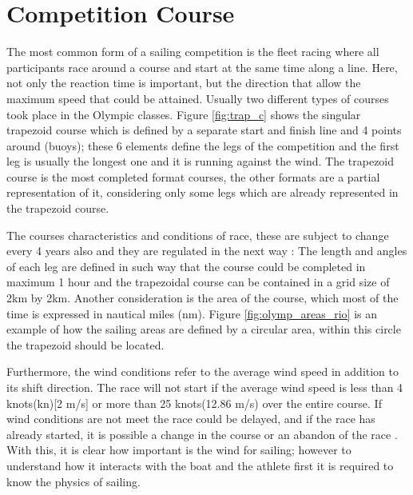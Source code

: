 \section{Competition Course}\label{tracks}
The most common form of a sailing competition is the fleet racing where all participants race around a course and start at the same time along a line. Here, not only the reaction time is important, but the direction that allow the maximum speed that could be attained. Usually two different types of courses took place in the Olympic classes. Figure \ref{fig:trap_c} shows the singular trapezoid course which is defined by a separate start and finish line and 4 points around (buoys); these 6 elements define the legs of the competition and the first leg is usually the longest one and it is running against the wind.
The trapezoid course is the most completed format courses, the other formats are a partial representation of it, considering only some legs which are already represented in the trapezoid course.\par 

The courses characteristics and conditions of race, these are subject to change every 4 years also and they are regulated in the next way \cite{race_pol}: The length and angles of each leg are defined in such way that the course could be completed in maximum 1 hour and the trapezoidal course can be contained in a grid size of 2km by 2km.  Another consideration is the area of the course,  which most of the time is expressed in nautical miles (nm). Figure \ref{fig:olymp_areas_rio} is an example of how the sailing areas are defined by a circular area, within this circle the trapezoid should be located. \par 
Furthermore, the wind conditions refer to the average wind speed in addition to its shift direction. The race will not start if the average wind speed is less than 4 knots(kn)[2 m/s] or more than 25 knots(12.86 m/s) over the entire course. %
If wind conditions are not meet the race could be delayed, and if the race has already started, it is possible a change in the course or an abandon of the race \cite{race_pol}. With this, it is clear how important is the wind for sailing; however to understand how it interacts with the boat and the athlete first it is required to know the physics of sailing. \par 

